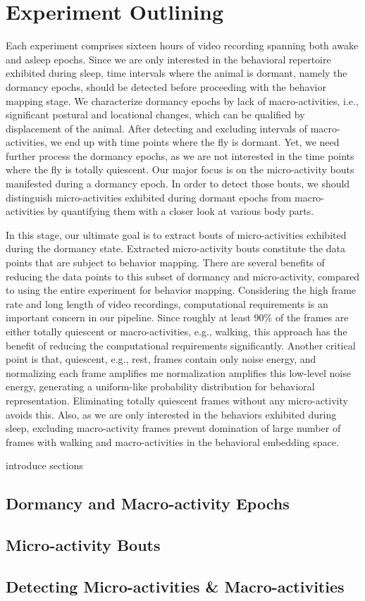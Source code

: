 \chapter{Experiment Outlining}
Each experiment comprises sixteen hours of video recording spanning both awake and asleep epochs.
Since we are only interested in the behavioral repertoire exhibited during sleep, time intervals where the animal is dormant, namely the dormancy epochs, should be detected before proceeding with the behavior mapping stage.
We characterize dormancy epochs by lack of macro-activities, i.e., significant postural and locational changes, which can be qualified by displacement of the animal.
After detecting and excluding intervals of macro-activities, we end up with time points where the fly is dormant.
Yet, we need further process the dormancy epochs, as we are not interested in the time points where the fly is totally quiescent.
Our major focus is on the micro-activity bouts manifested during a dormancy epoch.
In order to detect those bouts, we should distinguish micro-activities exhibited during dormant epochs from macro-activities by quantifying them with a closer look at various body parts.

In this stage, our ultimate goal is to extract bouts of micro-activities exhibited during the dormancy state.
Extracted micro-activity bouts constitute the data points that are subject to behavior mapping.
There are several benefits of reducing the data points to this subset of dormancy and micro-activity, compared to using the entire experiment for behavior mapping.
Considering the high frame rate and long length of video recordings, computational requirements is an important concern in our pipeline.
Since roughly at least $90\%$ of the frames are either totally quiescent or macro-activities, e.g., walking, this approach has the benefit of reducing the computational requirements significantly.
Another critical point is that, quiescent, e.g., rest, frames contain only noise energy, and normalizing each frame amplifies me normalization amplifies this low-level noise energy, generating a uniform-like probability distribution for behavioral representation.
Eliminating totally quiescent frames without any micro-activity avoids this.
Also, as we are only interested in the behaviors exhibited during sleep, excluding macro-activity frames prevent domination of large number of frames with walking and macro-activities in the behavioral embedding space.


introduce sections

\section{Dormancy and Macro-activity Epochs}

\section{Micro-activity Bouts}

\section{Detecting Micro-activities \& Macro-activities}
